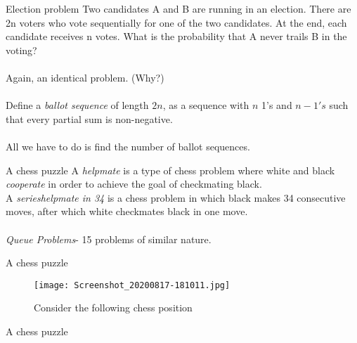 \documentclass[handout, dvipsnames]{beamer}
\theoremstyle{definition}
\begin{document}
\begin{frame}{Election problem}
    Two candidates A and B are running in an election. There are 2n voters who vote sequentially for one of the two candidates. At the end, each candidate receives n votes. What is the probability that A never trails B in the voting?\\\\
    Again, an identical problem. (Why?)\\\\
    Define a \emph{ballot sequence} of length $2n$, as a sequence with $n$ 1's and $n -1's$ such that every partial sum is non-negative. \\\\
    All we have to do is find the number of ballot sequences. 
\end{frame}

\begin{frame}{A chess puzzle}
    A \emph{helpmate} is a type of chess problem where white and black \emph{cooperate} in order to achieve the goal of checkmating black.\\
    A \emph{serieshelpmate in 34} is a chess problem in which black makes 34 consecutive moves, after which white checkmates black in one move. \\\\
    \emph{Queue Problems}- 15 problems of similar nature.
\end{frame}

\begin{frame}{A chess puzzle}
    \begin{figure}
        \centering
        \texttt{[image: Screenshot\_20200817-181011.jpg]}
        \caption{Consider the following chess position}
        \label{fig:my_label}
    \end{figure}
    \end{frame}
    
\begin{frame}{A chess puzzle}
     \\
    \\
\end{frame}
   
\end{document}
